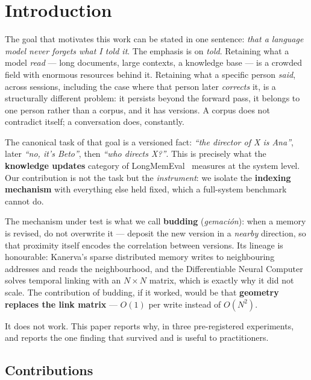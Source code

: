 \documentclass[11pt,a4paper]{article}
\begin{document}
\section{Introduction}

The goal that motivates this work can be stated in one sentence: \emph{that a language model never
forgets what I told it}. The emphasis is on \emph{told}. Retaining what a model \emph{read} ---
long documents, large contexts, a knowledge base --- is a crowded field with enormous resources
behind it. Retaining what a specific person \emph{said}, across sessions, including the case where
that person later \emph{corrects} it, is a structurally different problem: it persists beyond the
forward pass, it belongs to one person rather than a corpus, and it has versions. A corpus does not
contradict itself; a conversation does, constantly.

The canonical task of that goal is a versioned fact: \emph{``the director of X is Ana''}, later
\emph{``no, it's Beto''}, then \emph{``who directs X?''}. This is precisely what the
\textbf{knowledge updates} category of LongMemEval~\cite{longmemeval} measures at the system level.
Our contribution is not the task but the \emph{instrument}: we isolate the \textbf{indexing
mechanism} with everything else held fixed, which a full-system benchmark cannot do.

The mechanism under test is what we call \textbf{budding} (\emph{gemación}): when a memory is
revised, do not overwrite it --- deposit the new version in a \emph{nearby} direction, so that
proximity itself encodes the correlation between versions. Its lineage is honourable: Kanerva's
sparse distributed memory writes to neighbouring addresses and reads the neighbourhood, and the
Differentiable Neural Computer solves temporal linking with an $N \times N$ matrix, which is exactly
why it did not scale. The contribution of budding, if it worked, would be that \textbf{geometry
replaces the link matrix} --- $O(1)$ per write instead of $O(N^2)$.

It does not work. This paper reports why, in three pre-registered experiments, and reports the one
finding that survived and is useful to practitioners.

\subsection{Contributions}
\end{document}
